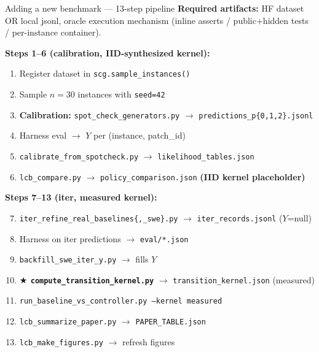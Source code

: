 \documentclass[10pt]{beamer}
\newcommand{\good}[1]{\textcolor{accentGreen}{\textbf{#1}}}
\newcommand{\warn}[1]{\textcolor{accentOrange}{\textbf{#1}}}
\newcommand{\info}[1]{\textcolor{primaryBlue}{\textbf{#1}}}
\begin{document}
\begin{frame}{Adding a new benchmark --- 13-step pipeline}
\vspace{0.1cm}
\info{Required artifacts:} HF dataset OR local jsonl, oracle execution
mechanism (inline asserts / public+hidden tests / per-instance container).

\vspace{0.15cm}
\small
\textbf{Steps 1--6 (calibration, IID-synthesized kernel):}
\begin{enumerate}\setlength\itemsep{0pt}
\item Register dataset in \texttt{scg.sample\_instances()}
\item Sample $n=30$ instances with \texttt{seed=42}
\item \info{Calibration:} \texttt{spot\_check\_generators.py} $\to$ \texttt{predictions\_p\{0,1,2\}.jsonl}
\item Harness eval $\to$ $Y$ per (instance, patch\_id)
\item \texttt{calibrate\_from\_spotcheck.py} $\to$ \texttt{likelihood\_tables.json}
\item \texttt{lcb\_compare.py} $\to$ \texttt{policy\_comparison.json} \warn{(IID kernel placeholder)}
\end{enumerate}

\textbf{Steps 7--13 (iter, measured kernel):}
\begin{enumerate}\setcounter{enumi}{6}\setlength\itemsep{0pt}
\item \texttt{iter\_refine\_real\_baselines\{,\_swe\}.py} $\to$ \texttt{iter\_records.jsonl} ($Y$=null)
\item Harness on iter predictions $\to$ \texttt{eval/*.json}
\item \texttt{backfill\_swe\_iter\_y.py} $\to$ fills $Y$
\item \good{$\bigstar$ \texttt{compute\_transition\_kernel.py}} $\to$ \texttt{transition\_kernel.json} (measured)
\item \texttt{run\_baseline\_vs\_controller.py --kernel measured}
\item \texttt{lcb\_summarize\_paper.py} $\to$ \texttt{PAPER\_TABLE.json}
\item \texttt{lcb\_make\_figures.py} $\to$ refresh figures
\end{enumerate}
\end{frame}
\end{document}

